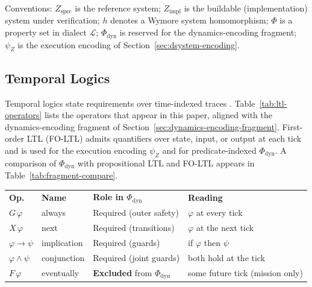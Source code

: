 Conventions: $Z_{\text{spec}}$ is the reference system; $Z_{\text{impl}}$ is the buildable (implementation) system under verification; $h$ denotes a Wymore system homomorphism; $\Phi$ is a property set in dialect $\mathcal{L}$; $\Phi_{\mathrm{dyn}}$ is reserved for the dynamics-encoding fragment; $\psi_Z$ is the execution encoding of Section~\ref{sec:dsystem-encoding}.

\subsection{Temporal Logics}
Temporal logics state requirements over time-indexed traces \citep{BaierKatoen2008,Pnueli1977}. Table~\ref{tab:ltl-operators} lists the operators that appear in this paper, aligned with the dynamics-encoding fragment of Section~\ref{sec:dynamics-encoding-fragment}. First-order LTL (FO-LTL) admits quantifiers over state, input, or output at each tick and is used for the execution encoding $\psi_Z$ and for predicate-indexed $\Phi_{\mathrm{dyn}}$. A comparison of $\Phi_{\mathrm{dyn}}$ with propositional LTL and FO-LTL appears in Table~\ref{tab:fragment-compare}.

\begingroup
\renewcommand{\arraystretch}{1.35}
\footnotesize
\begin{tabularx}{\textwidth}{@{}P{0.12\textwidth} P{0.16\textwidth} A{0.28\textwidth} A{0.38\textwidth}@{}}
    \headingfont\bfseries Op. & \headingfont\bfseries Name & \headingfont\bfseries Role in $\Phi_{\mathrm{dyn}}$ & \headingfont\bfseries Reading \\
    \addlinespace[2pt]
    $G\,\varphi$ & always & Required (outer safety) & $\varphi$ at every tick \\
    \addlinespace[2pt]
    $X\,\varphi$ & next & Required (transitions) & $\varphi$ at the next tick \\
    \addlinespace[2pt]
    $\varphi \rightarrow \psi$ & implication & Required (guards) & if $\varphi$ then $\psi$ \\
    \addlinespace[2pt]
    $\varphi \wedge \psi$ & conjunction & Required (joint guards) & both hold at the tick \\
    \addlinespace[2pt]
    $F\,\varphi$ & eventually & \textbf{Excluded} from $\Phi_{\mathrm{dyn}}$ & some future tick (mission only) \\
\end{tabularx}
\label{tab:ltl-operators}
\endgroup

